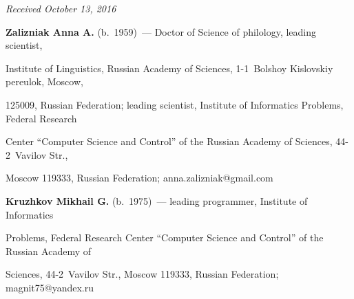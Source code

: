 \vspace*{-3pt}



\hfill{\small\textit{Received October 13, 2016}}



\Contr



\noindent

\textbf{Zalizniak Anna A.} (b.\ 1959)~---  Doctor of Science of philology, leading scientist, 

Institute of Linguistics, Russian Academy of Sciences, 1-1~Bolshoy Kislovskiy pereulok, Moscow, 

125009, Russian Federation; leading scientist, Institute of Informatics Problems, Federal Research 

Center ``Computer Science and Control'' of the Russian Academy of Sciences, 44-2~Vavilov Str., 

Moscow 119333, Russian Federation; \mbox{anna.zalizniak@gmail.com}



\vspace*{3pt}



\noindent

\textbf{Kruzhkov Mikhail G.} (b.\ 1975)~--- leading programmer, Institute of Informatics 

Problems, Federal Research Center ``Computer Science and Control'' of the Russian Academy of 

Sciences, 44-2~Vavilov Str., Moscow 119333, Russian Federation; \mbox{magnit75@yandex.ru}

\label{end\stat}





\renewcommand{\bibname}{\protect\rm Литература} 

